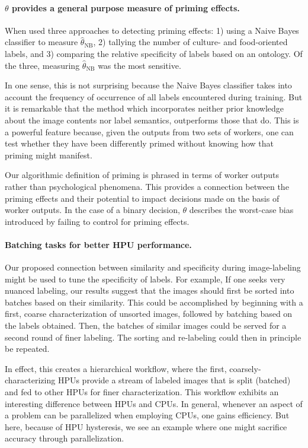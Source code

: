\documentclass[a4paper]{report}
\begin{document}
\paragraph{$\theta$ provides a general purpose measure of priming effects.}
When used three approaches to detecting priming effects: 1) using a Naive Bayes
classifier to measure $\hat{\theta}_\text{NB}$, 2) tallying the number of 
culture- and food-oriented labels, and 3) comparing the relative specificity
of labels based on an ontology.  Of the three, measuring $
\hat{\theta}_\text{NB}$ was the most sensitive.  

In one sense, this is not surprising because the Naive 
Bayes classifier takes into account the frequency of occurrence of all labels 
encountered during training.  But it is remarkable that the 
method which incorporates neither prior knowledge about the image contents nor 
label semantics, outperforms those that do.  This is a powerful feature 
because, given the outputs from two sets of workers, one can test whether they 
have been differently primed without knowing how that priming might manifest.

Our algorithmic definition of priming is phrased in terms of worker outputs
rather than psychological phenomena.  This provides a connection between
the priming effects and their potential to impact decisions made on the basis
of worker outputs.  In the case of a binary decision, $\theta$
describes the worst-case bias introduced by failing to control for priming 
effects.

\paragraph{Batching tasks for better HPU performance.}
Our proposed connection between similarity and specificity during 
image-labeling might be used to tune the specificity of labels.  For example,
If one seeks very nuanced labeling, our results suggest that the images 
should first be sorted into batches based on their similarity. This could be 
accomplished by beginning with a first, coarse characterization of unsorted 
images, followed by batching based on the labels obtained. Then, the batches
of similar images could be served for a second round of finer labeling. 
The sorting and re-labeling could then in principle be repeated.

In effect, this creates a hierarchical workflow, where the first, 
coarsely-characterizing HPUs provide a stream of labeled images that is 
split (batched) and fed to other HPUs for finer characterization.  This 
workflow exhibits an interesting difference between HPUs and CPUs.  In general,
whenever an aspect of a problem can be parallelized when employing CPUs, one
gains efficiency.  But here, because of HPU hysteresis, we see an example where
one might sacrifice accuracy through parallelization.
\end{document}
